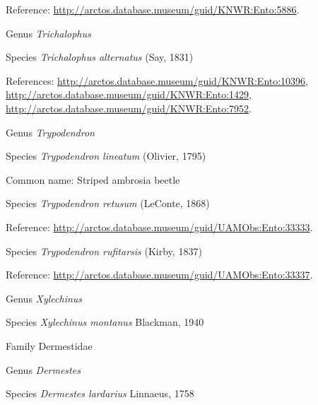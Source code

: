 \documentclass[9pt, article]{memoir}
\begin{document}
\begin{multicols}{2}
Reference: 
\url{http://arctos.database.museum/guid/KNWR:Ento:5886}.

\vspace{6pt}\noindent\hspace{30pt}Genus \textit{Trichalophus}


\vspace{6pt}\noindent\hspace{36pt}Species \textit{Trichalophus alternatus} (Say, 1831)


References: 
\url{http://arctos.database.museum/guid/KNWR:Ento:10396}, 
\url{http://arctos.database.museum/guid/KNWR:Ento:1429}, 
\url{http://arctos.database.museum/guid/KNWR:Ento:7952}.

\vspace{6pt}\noindent\hspace{30pt}Genus \textit{Trypodendron}


\vspace{6pt}\noindent\hspace{36pt}Species \textit{Trypodendron lineatum} (Olivier, 1795)


Common name: Striped ambrosia beetle

\vspace{6pt}\noindent\hspace{36pt}Species \textit{Trypodendron retusum} (LeConte, 1868)


Reference: 
\url{http://arctos.database.museum/guid/UAMObs:Ento:33333}.

\vspace{6pt}\noindent\hspace{36pt}Species \textit{Trypodendron rufitarsis} (Kirby, 1837)


Reference: 
\url{http://arctos.database.museum/guid/UAMObs:Ento:33337}.

\vspace{6pt}\noindent\hspace{30pt}Genus \textit{Xylechinus}


\vspace{6pt}\noindent\hspace{36pt}Species \textit{Xylechinus montanus} Blackman, 1940


\vspace{6pt}\noindent\hspace{24pt}Family Dermestidae


\vspace{6pt}\noindent\hspace{30pt}Genus \textit{Dermestes}


\vspace{6pt}\noindent\hspace{36pt}Species \textit{Dermestes lardarius} Linnaeus, 1758



\end{multicols}
\end{document}
